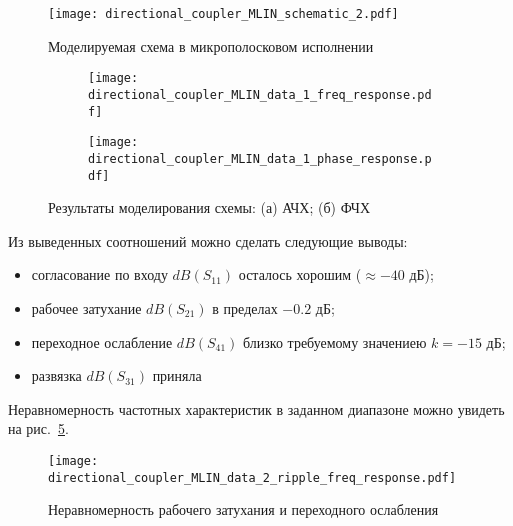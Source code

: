 \begin{figure}[!ht]
    \centering
    \texttt{[image: directional\_coupler\_MLIN\_schematic\_2.pdf]}
    \caption{Моделируемая схема в микрополосковом исполнении}%
    \label{fig:directional_coupler_MLIN_schematic_2}
\end{figure}

\begin{figure}[!ht]
    \begin{subfigure}[b]{0.45\textwidth}
        \centering
        \texttt{[image: directional\_coupler\_MLIN\_data\_1\_freq\_response.pdf]}
        \caption{}%
    \label{fig:directional_coupler_MLIN_data_1_freq_response}
    \end{subfigure}
    \hfill
    \begin{subfigure}[b]{0.45\textwidth}
        \centering
        \texttt{[image: directional\_coupler\_MLIN\_data\_1\_phase\_response.pdf]}
        \caption{}%
    \label{fig:directional_coupler_MLIN_data_1_phase_response}
    \end{subfigure}
    \caption{%
        Результаты моделирования схемы:
        (а) АЧХ;
        (б) ФЧХ
    }%
    \label{fig:directional_coupler_MLIN_data_1_responses}
\end{figure}

Из выведенных соотношений можно сделать следующие выводы:
\begin{itemize}
    \item согласование по входу $dB(S_{11})$ осталось хорошим ($\approx -40 \text{~дБ}$);
    \item рабочее затухание $dB(S_{21})$ в пределах $-0.2 \text{~дБ}$;
    \item переходное ослабление $dB(S_{41})$ близко требуемому значениею $k = -15 \text{~дБ}$;
    \item развязка $dB(S_{31})$ приняла
\end{itemize}


Неравномерность частотных характеристик в заданном диапазоне можно увидеть на рис.~\ref{fig:directional_coupler_MLIN_data_2_ripple_freq_response}.

\begin{figure}[!ht]
    \centering
    \texttt{[image: directional\_coupler\_MLIN\_data\_2\_ripple\_freq\_response.pdf]}
    \caption{Неравномерность рабочего затухания и переходного ослабления}%
    \label{fig:directional_coupler_MLIN_data_2_ripple_freq_response}
\end{figure}

